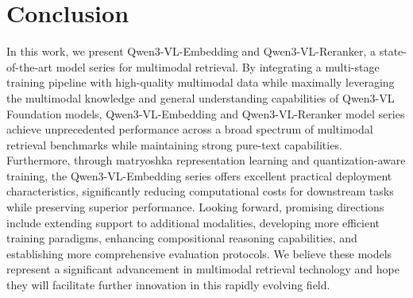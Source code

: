 \documentclass{article} %
\begin{document}
\section{Conclusion}
In this work, we present Qwen3-VL-Embedding and Qwen3-VL-Reranker, a state-of-the-art model series for multimodal retrieval. By integrating a multi-stage training pipeline with high-quality multimodal data while maximally leveraging the multimodal knowledge and general understanding capabilities of Qwen3-VL Foundation models, Qwen3-VL-Embedding and Qwen3-VL-Reranker model series achieve unprecedented performance across a broad spectrum of multimodal retrieval benchmarks while maintaining strong pure-text capabilities. Furthermore, through matryoshka representation learning and quantization-aware training, the Qwen3-VL-Embedding series offers excellent practical deployment characteristics, significantly reducing computational costs for downstream tasks while preserving superior performance. Looking forward, promising directions include extending support to additional modalities, developing more efficient training paradigms, enhancing compositional reasoning capabilities, and establishing more comprehensive evaluation protocols. We believe these models represent a significant advancement in multimodal retrieval technology and hope they will facilitate further innovation in this rapidly evolving field.






\appendix
\clearpage







% 
\end{document}
